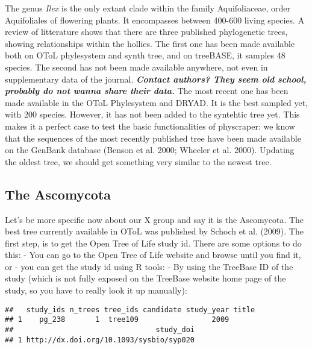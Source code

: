 \documentclass[draft]{ametsoc}
\begin{document}
The genus \emph{Ilex} is the only extant clade within the family
Aquifoliaceae, order Aquifoliales of flowering plants. It encompasses
between 400-600 living species. A review of litterature shows that there
are three published phylogenetic trees, showing relationships within the
hollies. The first one has been made available both on OToL phylesystem
and synth tree, and on treeBASE, it samples 48 species. The second has
not been made available anywhere, not even in supplementary data of the
journal. \textbf{\emph{Contact authors? They seem old school, probably
do not wanna share their data.}} The most recent one has been made
available in the OToL Phylesystem and DRYAD. It is the best sampled yet,
with 200 species. However, it has not been added to the syntehtic tree
yet. This makes it a perfect case to test the basic functionalities of
physcraper: we know that the sequences of the most recently published
tree have been made available on the GenBank database (Benson et al.
2000; Wheeler et al. 2000). Updating the oldest tree, we should get
something very similar to the newest tree.

\hypertarget{the-ascomycota}{%
\subsection{The Ascomycota}\label{the-ascomycota}}

Let's be more specific now about our X group and say it is the
Ascomycota. The best tree currently available in OToL was published by
Schoch et al. (2009). The first step, is to get the Open Tree of Life
study id. There are some options to do this: - You can go to the Open
Tree of Life website and browse until you find it, or - you can get the
study id using R tools: - By using the TreeBase ID of the study (which
is not fully exposed on the TreeBase website home page of the study, so
you have to really look it up manually):

\begin{Shaded}
\begin{Highlighting}[]
\OperatorTok{::}\NormalTok{(} \NormalTok{, } \NormalTok{)}
\end{Highlighting}
\end{Shaded}

\begin{verbatim}
##   study_ids n_trees tree_ids candidate study_year title
## 1    pg_238       1  tree109                 2009      
##                                 study_doi
## 1 http://dx.doi.org/10.1093/sysbio/syp020
\end{verbatim}
\end{document}
